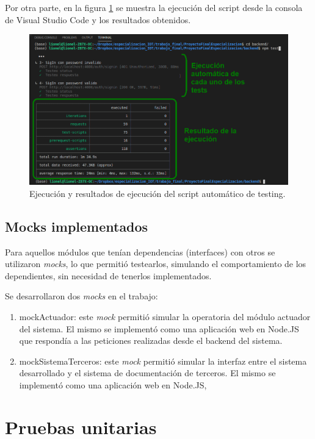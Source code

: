 Por otra parte, en la figura \ref{fig:newmanEjecucion} se muestra la ejecución del script desde la consola de Visual Studio Code y los resultados obtenidos. 


\begin{figure}[ht]
	\centering
	\includegraphics[width=1\textwidth]{./Figures/newmanEjecucion.png}
	\caption{Ejecución y resultados de ejecución del script automático de testing.}
	\label{fig:newmanEjecucion}
\end{figure}


\subsection{Mocks implementados}

Para aquellos módulos que tenían dependencias (interfaces) con otros se utilizaron \textit{mocks}, lo que permitió testearlos, simulando el comportamiento de los dependientes, sin necesidad de tenerlos implementados.

Se desarrollaron dos \textit{mocks} en el trabajo:

\begin{enumerate}
\item mockActuador: este \textit{mock} permitió simular la operatoria del módulo actuador del sistema. El mismo se implementó como una aplicación web en Node.JS que respondía a las peticiones realizadas desde el backend del sistema.
\item mockSistemaTerceros: este \textit{mock} permitió simular la interfaz entre el sistema desarrollado y el sistema de documentación de terceros. El mismo se implementó como una aplicación web en Node.JS, 
\end{enumerate}

    
\pagebreak
\section{Pruebas unitarias}

